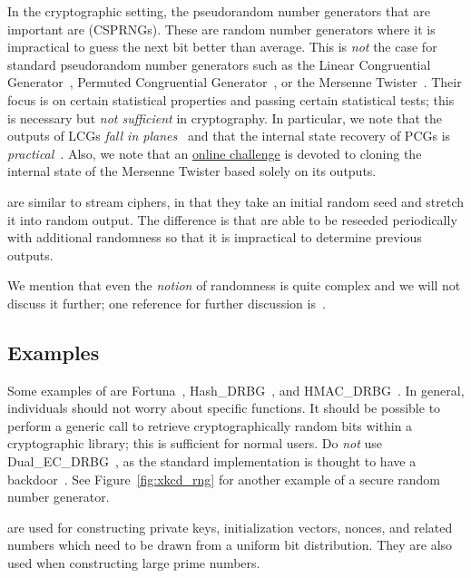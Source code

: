 In the cryptographic setting, the pseudorandom number generators
that are important are
\emph{}
(CSPRNGs).
These are random number generators where it is impractical
to guess the next bit better than average.
This is \emph{not} the case for standard pseudorandom number generators
such as the Linear Congruential Generator~\cite[Chapter 3.2.1]{TAOCP2},
Permuted Congruential Generator~\cite{PCG2014},
or the Mersenne Twister~\cite{matsumoto1998mersenne}.
Their focus is on certain statistical properties and passing
certain statistical tests;
this is necessary but \emph{not sufficient} in cryptography.
In particular, we note that the outputs of LCGs
\emph{fall in planes}~\cite{marsaglia1968random}
and that the internal state recovery of PCGs
is \emph{practical}~\cite{bouillaguet2020practical}.
Also, we note that an
\href{https://cryptopals.com/sets/3/challenges/23}{online challenge}
is devoted to cloning the internal state of the Mersenne Twister
based solely on its outputs.

 are similar to \glspl{stream cipher}, in that they take
an initial random seed and stretch it into random output.
The difference is that  are able to be reseeded
periodically with additional randomness
so that it is impractical to determine previous outputs.

We mention that even the \emph{notion} of randomness is quite complex
and we will not discuss it further;
one reference for further discussion is~\cite[Chapter 3.5]{TAOCP2}.

\subsection{Examples}

Some examples of  are
Fortuna~\cite[Chapter 10]{PracticalCryptography}\cite[Chapter 9]{CryptoEng},
Hash\_DRBG~\cite[Section~10.1.1]{NIST-SP-800-90ARev1},
and HMAC\_DRBG~\cite[Section~10.1.2]{NIST-SP-800-90ARev1}.
In general, individuals should not worry about specific
 functions.
It should be possible to perform a generic call to retrieve
cryptographically random bits within a cryptographic library;
this is sufficient for normal users.
Do \emph{not} use Dual\_EC\_DRBG~\cite[Section~10.3.1]{NIST-SP-800-90A},
as the standard implementation
is thought to have a backdoor~\cite{BernsteinDualEC}.
See Figure~\ref{fig:xkcd_rng} for another example of a
secure random number generator.

 are used for constructing private keys,
\glspl{initialization vector}, \glspl{nonce},
and related numbers which need to be drawn from a uniform bit distribution.
They are also used when constructing large prime numbers.

